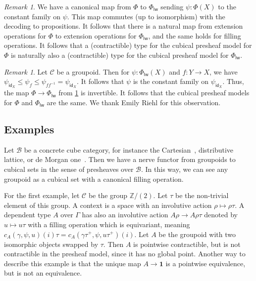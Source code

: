 \documentclass[10pt,a4paper,draft]{article}
\newcommand{\ints}{\mathbb{Z}}
\newcommand{\Unit}{\mathbf{1}}
\newcommand{\CC}{{\mathcal C}}
\newcommand{\id}{\mathsf{id}}
\newcommand{\BB}{\mathcal{B}}
\renewcommand{\~}{\widetilde}
\newcommand{\levelwise}{\mathsf{lw}}
\newcommand{\cofunivLW}{\Phi_{\levelwise}}
\newcommand{\cofunivConst}{\Phi}
\theoremstyle{definition}
\theoremstyle{remark} %
\newtheorem{remark}[theorem]{Remark}
\begin{document}
\begin{remark} \label{presheaf-model-comparison}
We have a canonical map from $\cofunivConst$ to $\cofunivLW$ sending $\psi : \cofunivConst(X)$ to the constant family on $\psi$.
This map commutes (up to isomorphism) with the decoding to propositions.
It follows that there is a natural map from extension operations for $\cofunivConst$ to extension operations for $\cofunivLW$, and the same holds for filling operations.
It follows that a (contractible) type for the cubical presheaf model for $\cofunivConst$ is naturally also a (contractible) type for the cubical presheaf model for $\cofunivLW$.
\end{remark}

\begin{remark} \label{presheaf-model-groupoid}
Let $\CC$ be a groupoid.
Then for $\psi : \cofunivLW(X)$ and $f : Y \to X$, we have $\psi_{\id_X} \leq \psi_f \leq \psi_{f f^{-1}} = \psi_{\id_X}.$
It follows that $\psi$ is the constant family on $\psi_{\id_X}$.
Thus, the map $\cofunivConst \to \cofunivLW$ from \cref{presheaf-model-comparison} is invertible.
It follows that the cubical presheaf models for $\cofunivConst$ and $\cofunivLW$ are the same.
We thank Emily Riehl for this observation.
\end{remark}

\subsection{Examples} \label{subsec:examples}

Let $\BB$ be a concrete cube category, for instance the Cartesian~\cite{AngiuliBCHHL}, distributive lattice, or de Morgan one~\cite{OrtonP16,CCHM15}.
Then we have a nerve functor from groupoids to cubical sets in the sense of presheaves over $\BB$.
In this way, we can see any groupoid as a cubical set with a canonical filling operation.

For the first example, let $\CC$ be the group $\ints/(2)$.
Let $\tau$ be the non\hyp{}trivial element of this group.
A context is a space with an involutive action $\rho\mapsto\rho\tau$.
A dependent type $A$ over $\Gamma$ has also an involutive action $A\rho\rightarrow A\rho\tau$ denoted by $u\mapsto u\tau$ with a filling operation which is equivariant, meaning $c_A(\gamma,\psi,u)(i)\tau = c_A(\gamma \tau^+,\psi, u\tau^+)(i)$.
Let $A$ be the groupoid with two isomorphic objects swapped by $\tau$.
Then $A$ is pointwise contractible, but is not contractible in the presheaf model, since it has no global point.
Another way to describe this example is that the unique map $A\rightarrow \Unit$ is a pointwise equivalence, but is not an equivalence.
\end{document}
